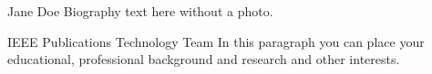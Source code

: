 \documentclass[lettersize,journal]{IEEEtran} %
\begin{document}
\begin{IEEEbiographynophoto}{Jane Doe} %
Biography text here without a photo.
\end{IEEEbiographynophoto} %

\begin{IEEEbiography}{IEEE Publications Technology Team}
In this paragraph you can place your educational, professional background and research and other interests.\end{IEEEbiography} %
\end{document}
